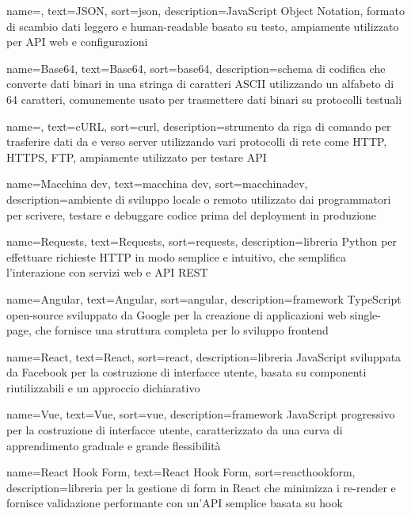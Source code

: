  {
    name=,
    text=JSON,
    sort=json,
    description={JavaScript Object Notation, formato di scambio dati leggero e human-readable basato su testo, ampiamente utilizzato per API web e configurazioni}
}

 {
    name=Base64,
    text=Base64,
    sort=base64,
    description={schema di codifica che converte dati binari in una stringa di caratteri ASCII utilizzando un alfabeto di 64 caratteri, comunemente usato per trasmettere dati binari su protocolli testuali}
}

 {
    name=,
    text=cURL,
    sort=curl,
    description={strumento da riga di comando per trasferire dati da e verso server utilizzando vari protocolli di rete come HTTP, HTTPS, FTP, ampiamente utilizzato per testare API}
}

 {
    name=Macchina dev,
    text=macchina dev,
    sort=macchinadev,
    description={ambiente di sviluppo locale o remoto utilizzato dai programmatori per scrivere, testare e debuggare codice prima del deployment in produzione}
}

 {
    name=Requests,
    text=Requests,
    sort=requests,
    description={libreria Python per effettuare richieste HTTP in modo semplice e intuitivo, che semplifica l'interazione con servizi web e API REST}
}

 {
    name=Angular,
    text=Angular,
    sort=angular,
    description={framework TypeScript open-source sviluppato da Google per la creazione di applicazioni web single-page, che fornisce una struttura completa per lo sviluppo frontend}
}

 {
    name=React,
    text=React,
    sort=react,
    description={libreria JavaScript sviluppata da Facebook per la costruzione di interfacce utente, basata su componenti riutilizzabili e un approccio dichiarativo}
}

 {
    name=Vue,
    text=Vue,
    sort=vue,
    description={framework JavaScript progressivo per la costruzione di interfacce utente, caratterizzato da una curva di apprendimento graduale e grande flessibilità}
}

 {
    name=React Hook Form,
    text=React Hook Form,
    sort=reacthookform,
    description={libreria per la gestione di form in React che minimizza i re-render e fornisce validazione performante con un'API semplice basata su hook}
}


